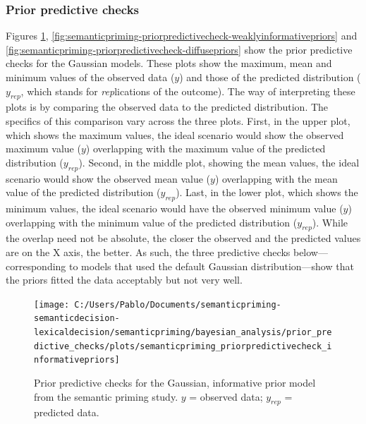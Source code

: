 \documentclass[
  12pt,
  man,floatsintext]{apa7}
\begin{document}
\hypertarget{prior-predictive-checks}{%
\subsubsection{Prior predictive checks}\label{prior-predictive-checks}}

Figures \ref{fig:semanticpriming-priorpredictivecheck-informativepriors}, \ref{fig:semanticpriming-priorpredictivecheck-weaklyinformativepriors} and \ref{fig:semanticpriming-priorpredictivecheck-diffusepriors} show the prior predictive checks for the Gaussian models. These plots show the maximum, mean and minimum values of the observed data (\(y\)) and those of the predicted distribution (\(y_{rep}\), which stands for \emph{rep}lications of the outcome). The way of interpreting these plots is by comparing the observed data to the predicted distribution. The specifics of this comparison vary across the three plots. First, in the upper plot, which shows the maximum values, the ideal scenario would show the observed maximum value (\(y\)) overlapping with the maximum value of the predicted distribution (\(y_{rep}\)). Second, in the middle plot, showing the mean values, the ideal scenario would show the observed mean value (\(y\)) overlapping with the mean value of the predicted distribution (\(y_{rep}\)). Last, in the lower plot, which shows the minimum values, the ideal scenario would have the observed minimum value (\(y\)) overlapping with the minimum value of the predicted distribution (\(y_{rep}\)). While the overlap need not be absolute, the closer the observed and the predicted values are on the X axis, the better. As such, the three predictive checks below---corresponding to models that used the default Gaussian distribution---show that the priors fitted the data acceptably but not very well.



\begin{figure}

{\centering \texttt{[image: C:/Users/Pablo/Documents/semanticpriming-semanticdecision-lexicaldecision/semanticpriming/bayesian\_analysis/prior\_predictive\_checks/plots/semanticpriming\_priorpredictivecheck\_informativepriors]} 

}

\caption{Prior predictive checks for the Gaussian, informative prior model from the semantic priming study. \(y\) = observed data; \(y_{rep}\) = predicted data.}\label{fig:semanticpriming-priorpredictivecheck-informativepriors}
\end{figure}
\end{document}
